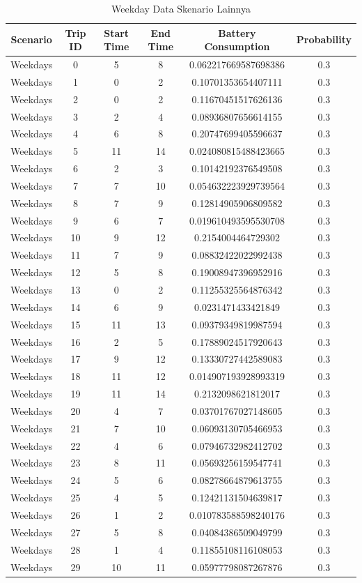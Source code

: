 \documentclass{skripsimathugm}
\begin{document}
\begin{table}[H]
\centering
\caption{Weekday Data Skenario Lainnya}
\label{Weekday Data Skenario Lainnya}
\begin{tabular}{|c|c|c|c|c|c|}
\hline
\textbf{Scenario} & \textbf{Trip ID} & \textbf{Start Time} & \textbf{End Time} & \textbf{Battery Consumption} & \textbf{Probability} \\
\hline
Weekdays & 0 & 5 & 8 & 0.062217669587698386 & 0.3 \\
Weekdays & 1 & 0 & 2 & 0.10701353654407111 & 0.3 \\
Weekdays & 2 & 0 & 2 & 0.11670451517626136 & 0.3 \\
Weekdays & 3 & 2 & 4 & 0.08936807656614155 & 0.3 \\
Weekdays & 4 & 6 & 8 & 0.20747699405596637 & 0.3 \\
Weekdays & 5 & 11 & 14 & 0.024080815488423665 & 0.3 \\
Weekdays & 6 & 2 & 3 & 0.10142192376549508 & 0.3 \\
Weekdays & 7 & 7 & 10 & 0.054632223929739564 & 0.3 \\
Weekdays & 8 & 7 & 9 & 0.12814905906809582 & 0.3 \\
Weekdays & 9 & 6 & 7 & 0.019610493595530708 & 0.3 \\
Weekdays & 10 & 9 & 12 & 0.2154004464729302 & 0.3 \\
Weekdays & 11 & 7 & 9 & 0.08832422022992438 & 0.3 \\
Weekdays & 12 & 5 & 8 & 0.19008947396952916 & 0.3 \\
Weekdays & 13 & 0 & 2 & 0.11255325564876342 & 0.3 \\
Weekdays & 14 & 6 & 9 & 0.0231471433421849 & 0.3 \\
Weekdays & 15 & 11 & 13 & 0.09379349819987594 & 0.3 \\
Weekdays & 16 & 2 & 5 & 0.17889024517920643 & 0.3 \\
Weekdays & 17 & 9 & 12 & 0.13330727442589083 & 0.3 \\
Weekdays & 18 & 11 & 12 & 0.014907193928993319 & 0.3 \\
Weekdays & 19 & 11 & 14 & 0.2132098621812017 & 0.3 \\
Weekdays & 20 & 4 & 7 & 0.03701767027148605 & 0.3 \\
Weekdays & 21 & 7 & 10 & 0.06093130705466953 & 0.3 \\
Weekdays & 22 & 4 & 6 & 0.07946732982412702 & 0.3 \\
Weekdays & 23 & 8 & 11 & 0.05693256159547741 & 0.3 \\
Weekdays & 24 & 5 & 6 & 0.08278664879613755 & 0.3 \\
Weekdays & 25 & 4 & 5 & 0.12421131504639817 & 0.3 \\
Weekdays & 26 & 1 & 2 & 0.010783588598240176 & 0.3 \\
Weekdays & 27 & 5 & 8 & 0.04084386509049799 & 0.3 \\
Weekdays & 28 & 1 & 4 & 0.11855108116108053 & 0.3 \\
Weekdays & 29 & 10 & 11 & 0.05977798087267876 & 0.3 \\
\hline
\end{tabular}
\end{table}
\end{document}
